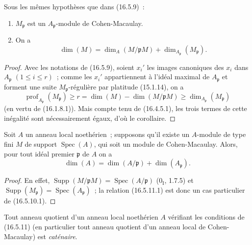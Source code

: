 \begin{corollary}[16.5.10]
\label{0.16.5.10-fr}
Sous les mêmes hypothèses que dans (16.5.9)~:
\begin{enumerate}
  \item[(i)] $M_{\mathfrak{p}}$ est un $A_{\mathfrak{p}}$-module de
  Cohen-Macaulay.
  \item[(ii)] On a
  \begin{equation}
  \label{0.16.5.10.1-fr}
  \tag{16.5.10.1}
    \dim(M)=\dim_A(M/\mathfrak{p}M)
    +\dim_{A_{\mathfrak{p}}}(M_{\mathfrak{p}}).
  \end{equation}
\end{enumerate}
\end{corollary}

\begin{proof}
Avec les notations de (16.5.9), soient $x_i'$ les images canoniques des $x_i$
dans $A_{\mathfrak{p}}$ $(1\leq i\leq r)$~; comme les $x_i'$ appartiennent à
l'idéal maximal de $A_{\mathfrak{p}}$ et forment une suite
$M_{\mathfrak{p}}$-régulière par platitude (15.1.14), on a
\[
  \operatorname{prof}_{A_{\mathfrak{p}}}(M_{\mathfrak{p}})
  \geq r=\dim(M)-\dim(M/\mathfrak{p}M)
  \geq\dim_{A_{\mathfrak{p}}}(M_{\mathfrak{p}})
\]
(en vertu de (16.1.8.1)). Mais compte tenu de (16.4.5.1), les trois termes de
cette inégalité sont nécessairement égaux, d'où le corollaire.
\end{proof}


\begin{corollary}[16.5.11]
\label{0.16.5.11-fr}
Soit $A$ un anneau local noethérien~; supposons qu'il existe un $A$-module de
type fini $M$ de support $\operatorname{Spec}(A)$, qui soit un module de
Cohen-Macaulay. Alors, pour tout idéal premier $\mathfrak{p}$ de $A$ on a
\begin{equation}
\label{0.16.5.11.1-fr}
\tag{16.5.11.1}
  \dim(A)=\dim(A/\mathfrak{p})+\dim(A_{\mathfrak{p}}).
\end{equation}
\end{corollary}

\begin{proof}
En effet, $\operatorname{Supp}(M/\mathfrak{p}M)
=\operatorname{Spec}(A/\mathfrak{p})$ ($0_{\mathrm I}$, 1.7.5) et
$\operatorname{Supp}(M_{\mathfrak{p}})
=\operatorname{Spec}(A_{\mathfrak{p}})$~; la relation (16.5.11.1) est donc un
cas particulier de (16.5.10.1).
\end{proof}

\begin{corollary}[16.5.12]
\label{0.16.5.12-fr}
Tout anneau quotient d'un anneau local noethérien $A$ vérifiant les conditions
de (16.5.11) (en particulier tout anneau quotient d'un anneau local de
Cohen-Macaulay) est \emph{caténaire}.
\end{corollary}


